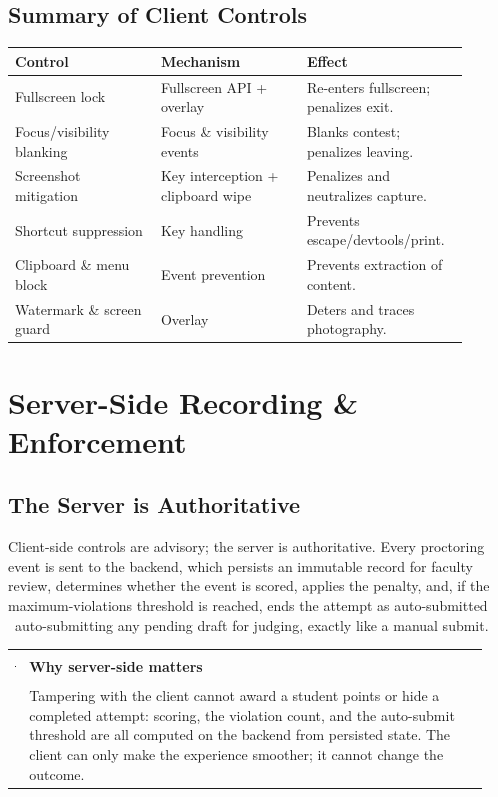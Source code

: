 \documentclass[12pt,a4paper,oneside]{report}
\makeatletter
\newenvironment{callout}[1]{\par\vspace{4pt}\noindent
  \begin{tabular}{@{}p{0.014\linewidth}@{\hspace{0.6em}}p{0.93\linewidth}@{}}
  \textcolor{boxframe}{\rule{2pt}{\baselineskip}} & \textbf{\textcolor{tcetblue}{#1}}\\[2pt] & }{\end{tabular}\par\vspace{6pt}}
\makeatother
\begin{document}
\section{Summary of Client Controls}
\begin{longtable}{@{}p{0.30\linewidth} p{0.30\linewidth} p{0.30\linewidth}@{}}
\toprule
\textbf{Control} & \textbf{Mechanism} & \textbf{Effect}\\
\midrule
\endhead
Fullscreen lock & Fullscreen API + overlay & Re-enters fullscreen; penalizes exit.\\
Focus/visibility blanking & Focus \& visibility events & Blanks contest; penalizes leaving.\\
Screenshot mitigation & Key interception + clipboard wipe & Penalizes and neutralizes capture.\\
Shortcut suppression & Key handling & Prevents escape/devtools/print.\\
Clipboard \& menu block & Event prevention & Prevents extraction of content.\\
Watermark \& screen guard & Overlay & Deters and traces photography.\\
\bottomrule
\end{longtable}

\chapter{Server-Side Recording \& Enforcement}
\section{The Server is Authoritative}
Client-side controls are advisory; the server is authoritative. Every proctoring
event is sent to the backend, which persists an immutable record for faculty
review, determines whether the event is scored, applies the penalty, and, if the
maximum-violations threshold is reached, ends the attempt as auto-submitted
\textemdash\ auto-submitting any pending draft for judging, exactly like a manual
submit.

\begin{callout}{Why server-side matters}
Tampering with the client cannot award a student points or hide a completed
attempt: scoring, the violation count, and the auto-submit threshold are all
computed on the backend from persisted state. The client can only make the
experience smoother; it cannot change the outcome.
\end{callout}
\end{document}
